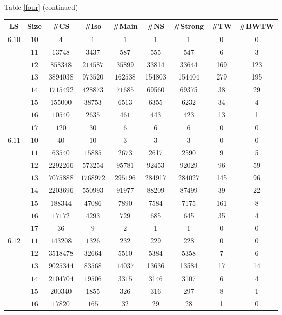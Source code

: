 \newpage
\begin{center}
Table \ref{four} (continued)
\begin{tabular}{|c|c|c|c|c|c|c|c|c|} \hline
 LS & Size & \#CS & \#Iso & \#Main& \#NS & \#Strong & \#TW & \#BWTW \\ \hline
$6.10$& $10$  & $4$ & $1$ & $1$ & 1 & 1 & 0 & 0 \\
      & $11$  & $13748$ & $3437$ & $587$ & 555 & 547 & 6 & 3 \\
      & $12$  & $858348$ & $214587$ & $35899$ & 33814 & 33644 & 169 & 123 \\
      & $13$  & $3894038$ & $973520$ & $162538$ & 154803 & 154404 & 279 & 195 \\
      & $14$  & $1715492$ & $428873$ & $71685$ & 69560 & 69375 & 38 & 29 \\
      & $15$  & $155000$ & $38753$ & $6513$ & 6355 & 6232 & 34 & 4 \\
      & $16$  & $10540$ & $2635$ & $461$ & 443 & 423 & 13 & 1 \\ 
      & $17$  & $120$ & $30$ & $6$ & 6 & 6 & 0 & 0 \\ \hline
$6.11$& $10$  & $40$ & $10$ & $3$ & 3 & 3 & 0 & 0 \\
      & $11$  & $63540$ & $15885$ & $2673$ & 2617 & 2590 & 9 & 5 \\
      & $12$  & $2292266$ & $573254$ & $95781$ & 92453 & 92029 & 96 & 59 \\
      & $13$  & $7075888$ & $1768972$ & $295196$ & 284917 & 284027 & 145 & 96 \\
      & $14$  & $2203696$ & $550993$ & $91977$ & 88209 & 87499 & 39 & 22 \\
      & $15$  & $188344$ & $47086$ & $7890$ & 7584 & 7175 & 161 & 8  \\
      & $16$  & $17172$ & $4293$ & $729$ & 685 & 645 & 35 & 4 \\ 
      & $17$  & $36$ & $9$ & $2$ & 1 & 1 & 0 & 0 \\ \hline
$6.12$& $11$  & $143208$ & $1326$ & $232$ & 229 & 228 & 0 & 0 \\
      & $12$  & $3518478$ & $32664$ & $5510$ & 5384 & 5358 & 7 & 6 \\
      & $13$  & $9025344$ & $83568$ & $14037$ & 13636 & 13584 & 17 & 14 \\
      & $14$  & $2104704$ & $19506$ & $3315$ & 3146 & 3107 & 6 & 4 \\
      & $15$  & $200340$ & $1855$ & $326$ & 316 & 297 & 8 & 1 \\
      & $16$  & $17820$ & $165$ & $32$ & 29 & 28 & 1 & 0 \\ \hline
\end{tabular}\vspace {3mm} \\
\end{center}


